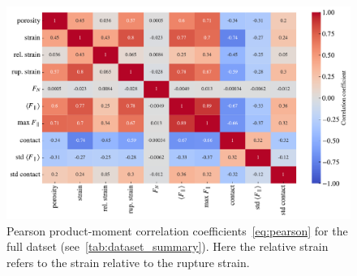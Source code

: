  

\begin{figure}[!htb]
  \centering
  \includegraphics[width=0.90\linewidth]{figures/ML/corrcoef_matrix.pdf}
  \caption{Pearson product-moment correlation coefficients~\cref{eq:pearson} for the full datset (see~\cref{tab:dataset_summary}). Here the relative strain refers to the strain relative to the rupture strain. }
  \label{fig:corrcoef_matrix}
\end{figure}


